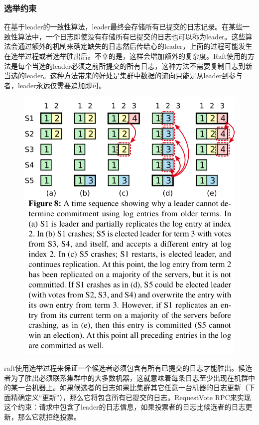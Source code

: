 \documentclass[journal]{IEEEtran}
\begin{document}
\subsubsection{选举约束}
在基于leader的一致性算法，leader最终会存储所有已提交的日志记录。在某些一致性算法中，一个日志即使没有存储所有已提交的日志也可以称为leader。这些算法会通过额外的机制来确定缺失的日志然后传给心的leader，上面的过程可能发生在选举过程或者选举胜出后。不幸的是，这样会增加额外的复杂度。Raft使用的方法是每个当选的leader必须之前所提交的所有日志，这种方法不需要复制日志到新当选的leader。这种方法带来的好处是集群中数据的流向只能是从leader到参与者，leader永远仅需要追加即可。

\begin{figure}[htbp]
\begin{center}
\includegraphics[width=1\linewidth]{./fig8.png}
\end{center}
\end{figure}

raft使用选举过程来保证一个候选者必须包含有所有已提交的日志才能胜出。候选者为了胜出必须联系集群中的大多数机器，这就意味着每条日志至少出现在机群中的某一台机器上。如果候选者的日志如果比集群其它任意一台机器的日志更新（下面精确定义“更新”），那么它将包含所有已提交的日志。RequestVote RPC来实现这个约束：请求中包含了leader的日志信息，如果投票者的日志比候选者的日志更新，那么它就拒绝投票。
\end{document}
